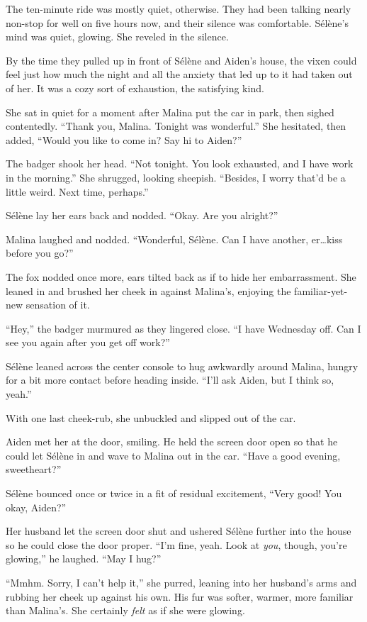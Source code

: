 The ten-minute ride was mostly quiet, otherwise. They had been talking nearly non-stop for well on five hours now, and their silence was comfortable. Sélène's mind was quiet, glowing. She reveled in the silence.

By the time they pulled up in front of Sélène and Aiden's house, the vixen could feel just how much the night and all the anxiety that led up to it had taken out of her. It was a cozy sort of exhaustion, the satisfying kind.

She sat in quiet for a moment after Malina put the car in park, then sighed contentedly. ``Thank you, Malina. Tonight was wonderful.'' She hesitated, then added, ``Would you like to come in? Say hi to Aiden?''

The badger shook her head. ``Not tonight. You look exhausted, and I have work in the morning.'' She shrugged, looking sheepish. ``Besides, I worry that'd be a little weird. Next time, perhaps.''

Sélène lay her ears back and nodded. ``Okay. Are you alright?''

Malina laughed and nodded. ``Wonderful, Sélène. Can I have another, er\ldots{}kiss before you go?''

The fox nodded once more, ears tilted back as if to hide her embarrassment. She leaned in and brushed her cheek in against Malina's, enjoying the familiar-yet-new sensation of it.

``Hey,'' the badger murmured as they lingered close. ``I have Wednesday off. Can I see you again after you get off work?''

Sélène leaned across the center console to hug awkwardly around Malina, hungry for a bit more contact before heading inside. ``I'll ask Aiden, but I think so, yeah.''

With one last cheek-rub, she unbuckled and slipped out of the car.

Aiden met her at the door, smiling. He held the screen door open so that he could let Sélène in and wave to Malina out in the car. ``Have a good evening, sweetheart?''

Sélène bounced once or twice in a fit of residual excitement, ``Very good! You okay, Aiden?''

Her husband let the screen door shut and ushered Sélène further into the house so he could close the door proper. ``I'm fine, yeah. Look at \emph{you}, though, you're glowing,'' he laughed. ``May I hug?''

``Mmhm. Sorry, I can't help it,'' she purred, leaning into her husband's arms and rubbing her cheek up against his own. His fur was softer, warmer, more familiar than Malina's. She certainly \emph{felt} as if she were glowing.

